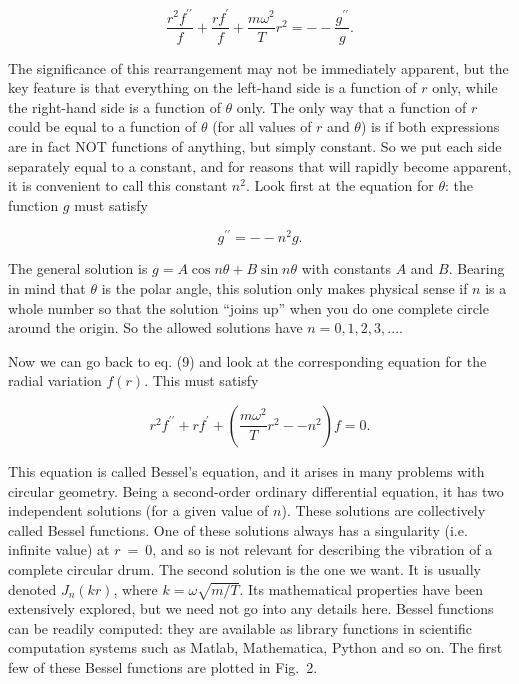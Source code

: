   \begin{equation*}\frac{ r^2 f^{\prime \prime}}{f} + \frac{ r f^{\prime}}{f} + 
  \frac{m \omega^2}{T}r^2 = -- \frac{g^{\prime \prime}}{g} . 
  \tag{9}\end{equation*} 

  The significance of this rearrangement may not be immediately apparent, but 
  the key feature is that everything on the left-hand side is a function of $r$ 
  only, while the right-hand side is a function of $\theta$ only. The only way 
  that a function of $r$ could be equal to a function of $\theta$ (for all 
  values of $r$ and $\theta$) is if both expressions are in fact NOT functions 
  of anything, but simply constant. So we put each side separately equal to a 
  constant, and for reasons that will rapidly become apparent, it is convenient 
  to call this constant $n^2$. Look first at the equation for $\theta$: the 
  function $g$ must satisfy 

  \begin{equation*}g^{\prime \prime} = -- n^2 g. \tag{10}\end{equation*} 

  The general solution is $g=A \cos n \theta+B \sin n \theta$ with constants 
  $A$ and $B$. Bearing in mind that $\theta$ is the polar angle, this solution 
  only makes physical sense if $n$ is a whole number so that the solution 
  ``joins up'' when you do one complete circle around the origin. So the 
  allowed solutions have $n=0, 1, 2, 3,...$. 

  Now we can go back to eq. (9) and look at the corresponding equation for the 
  radial variation $f(r)$. This must satisfy 

  \begin{equation*}r^2 f^{\prime \prime} + r f^{\prime} + \left(\frac{m 
  \omega^2}{T} r^2 -- n^2 \right) f = 0 . \tag{11}\end{equation*} 

  This equation is called Bessel’s equation, and it arises in many problems 
  with circular geometry. Being a second-order ordinary differential equation, 
  it has two independent solutions (for a given value of $n$). These solutions 
  are collectively called Bessel functions. One of these solutions always has a 
  singularity (i.e. infinite value) at $r~=~0$, and so is not relevant for 
  describing the vibration of a complete circular drum. The second solution is 
  the one we want. It is usually denoted $J_n(kr)$, where $k= \omega 
  \sqrt{m/T}$. Its mathematical properties have been extensively explored, but 
  we need not go into any details here. Bessel functions can be readily 
  computed: they are available as library functions in scientific computation 
  systems such as Matlab, Mathematica, Python and so on. The first few of these 
  Bessel functions are plotted in Fig.\ 2. 

